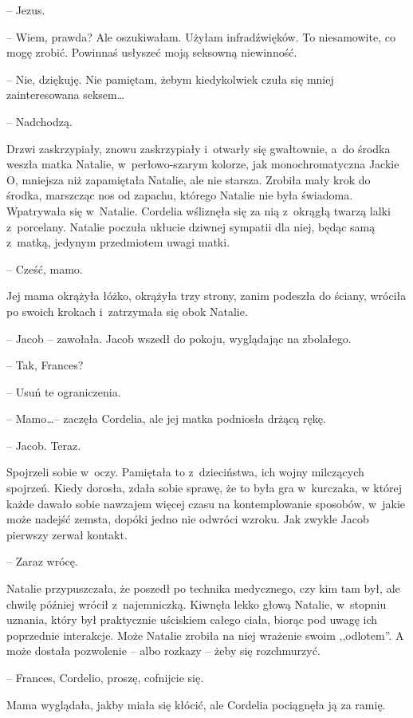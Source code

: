 \documentclass[oneside,polish,11pt,sfheadings]{mwbk}
\begin{document}
-- Jezus.

-- Wiem, prawda? Ale oszukiwałam. Użyłam infradźwięków. To niesamowite,
co mogę zrobić. Powinnaś usłyszeć moją seksowną niewinność.

-- Nie, dziękuję. Nie pamiętam, żebym kiedykolwiek czuła się mniej
zainteresowana seksem\ldots 

-- Nadchodzą.

Drzwi zaskrzypiały, znowu zaskrzypiały i~otwarły się gwałtownie, a~do
środka weszła matka Natalie, w~perłowo-szarym kolorze, jak
monochromatyczna Jackie O, mniejsza niż zapamiętała Natalie, ale nie
starsza. Zrobiła mały krok do środka, marszcząc nos od zapachu, którego
Natalie nie była świadoma. Wpatrywała się w~Natalie. Cordelia wśliznęła
się za nią z~okrągłą twarzą lalki z~porcelany. Natalie poczuła ukłucie
dziwnej sympatii dla niej, będąc samą z~matką, jedynym przedmiotem uwagi
matki.

-- Cześć, mamo.

Jej mama okrążyła łóżko, okrążyła trzy strony, zanim podeszła do ściany,
wróciła po swoich krokach i~zatrzymała się obok Natalie.

-- Jacob -- zawołała. Jacob wszedł do pokoju, wyglądając na zbolałego.

-- Tak, Frances?

-- Usuń te ograniczenia.

-- Mamo\ldots  -- zaczęła Cordelia, ale jej matka podniosła drżącą rękę.

-- Jacob. Teraz.

Spojrzeli sobie w~oczy. Pamiętała to z~dzieciństwa, ich wojny milczących
spojrzeń. Kiedy dorosła, zdała sobie sprawę, że to była gra w~kurczaka,
w której każde dawało sobie nawzajem więcej czasu na kontemplowanie
sposobów, w~jakie może nadejść zemsta, dopóki jedno nie odwróci wzroku.
Jak zwykle Jacob pierwszy zerwał kontakt.

-- Zaraz wrócę.

Natalie przypuszczała, że poszedł po technika medycznego, czy kim tam
był, ale chwilę później wrócił z~najemniczką. Kiwnęła lekko głową
Natalie, w~stopniu uznania, który był praktycznie uściskiem całego
ciała, biorąc pod uwagę ich poprzednie interakcje. Może Natalie zrobiła
na niej wrażenie swoim ,,odlotem''. A może dostała pozwolenie -- albo
rozkazy -- żeby się rozchmurzyć.

-- Frances, Cordelio, proszę, cofnijcie się.

Mama wyglądała, jakby miała się kłócić, ale Cordelia pociągnęła ją za
ramię. 
\end{document}
